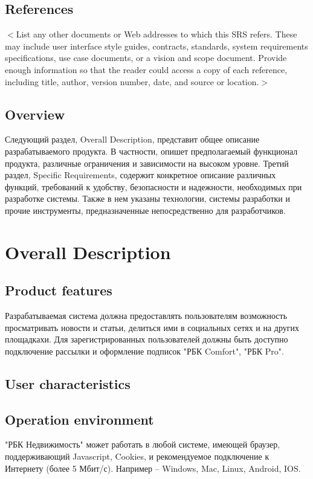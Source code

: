 \documentclass{scrreprt}
\begin{document}
\section{References}
$<$List any other documents or Web addresses to which this SRS refers. These may 
include user interface style guides, contracts, standards, system requirements 
specifications, use case documents, or a vision and scope document. Provide 
enough information so that the reader could access a copy of each reference, 
including title, author, version number, date, and source or location.$>$

\section{Overview}
Следующий раздел, Overall Description, представит общее описание разрабатываемого
продукта. В частности, опишет предполагаемый функционал продукта, различные
ограничения и зависимости на высоком уровне.
Третий раздел, Specific Requirements, содержит конкретное описание различных функций,
требований к удобству, безопасности и надежности, необходимых при разработке системы.
Также в нем указаны технологии, системы разработки и прочие инструменты,
предназначенные непосредственно для разработчиков.

\chapter{Overall Description}

\section{Product features}
Разрабатываемая система должна предоставлять пользователям возможность
просматривать новости и статьи, делиться ими в
социальных сетях и на других площадкахи. Для
зарегистрированных пользователей должны быть доступно подключение рассылки и оформление подписок "РБК Comfort", "РБК Pro".

\section{User characteristics}


\section{Operation environment}
"РБК Недвижимость" может работать в любой системе, имеющей браузер, поддерживающий Javascript, Cookies, и рекомендуемое подключение к Интернету (более 5 Мбит/с). Например – Windows, Mac, Linux, Android, IOS.
\end{document}
